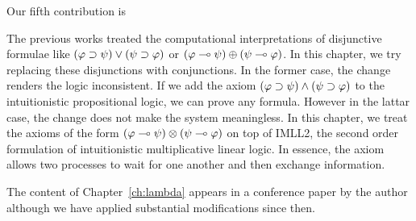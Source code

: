 Our fifth contribution is

The previous works treated the computational interpretations of
disjunctive formulae like $(\varphi\supset\psi)\lor(\psi\supset\varphi)$ or
$(\varphi\multimap\psi)\oplus(\psi\multimap\varphi)$.  In this chapter, we try
replacing these disjunctions with conjunctions.
In the former case, the change renders the logic inconsistent.
If we add the axiom $(\varphi\supset\psi)\land(\psi\supset\varphi)$ to the
intuitionistic propositional logic,
we can prove any formula.  However in the lattar case, the change does
not make the system meaningless.
In this chapter, we treat
the axioms of the form $(\varphi\multimap\psi)\otimes(\psi\multimap\varphi)$
on top of IMLL2, the second order formulation of intuitionistic
multiplicative linear
logic.  In essence, the axiom allows two processes to wait for one
another and then exchange information.

The content of Chapter~\ref{ch:lambda} appears in
a conference paper by the author \citep{hiraiflops2012}
although we have applied substantial modifications since then.





